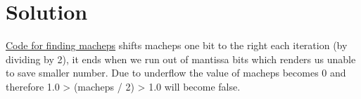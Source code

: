 \section{Solution}


\hyperlink{function1_macheps}{Code for finding macheps} shifts macheps one bit to the right each iteration (by dividing by 2), it ends when we run out of mantissa bits which renders us unable to save smaller number. Due to underflow the value of macheps becomes 0 and therefore 1.0 > (macheps / 2) > 1.0 will become false.
\newpage
